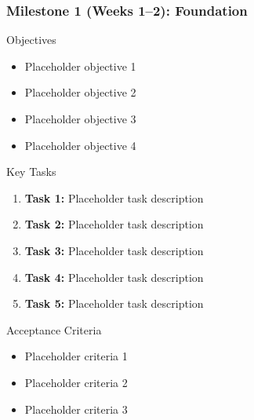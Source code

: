 \begin{frame}
\frametitle{Milestone 1 (Weeks 1--2): Foundation}
\begin{block}{Objectives}
\begin{itemize}
\item Placeholder objective 1
\item Placeholder objective 2
\item Placeholder objective 3
\item Placeholder objective 4
\end{itemize}
\end{block}

\begin{block}{Key Tasks}
\begin{enumerate}
\item \textbf{Task 1:} Placeholder task description
\item \textbf{Task 2:} Placeholder task description
\item \textbf{Task 3:} Placeholder task description
\item \textbf{Task 4:} Placeholder task description
\item \textbf{Task 5:} Placeholder task description
\end{enumerate}
\end{block}

\begin{block}{Acceptance Criteria}
\begin{itemize}
\item Placeholder criteria 1
\item Placeholder criteria 2
\item Placeholder criteria 3
\end{itemize}
\end{block}
\end{frame}

